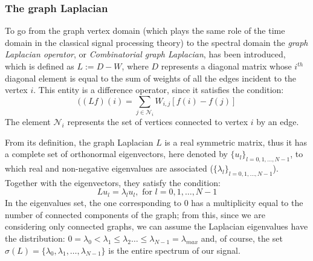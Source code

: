 \subsubsection{The graph Laplacian}
\label{sec:graph laplacian}
To go from the graph vertex domain (which plays the same role of the time domain in the classical signal processing theory) to the spectral domain the \textit{graph Laplacian operator}, or \textit{Combinatorial graph Laplacian}, has been introduced, which is defined as $L := D - W$, where $D$ represents a diagonal matrix whose  $i^{th}$ diagonal element is equal to the sum of weights of all the edges incident to the vertex $i$. This entity is a difference operator, since it satisfies the condition:
\begin{equation}
((L f)(i) = \sum_{j \in \mathcal{N}_i} W_{i,j}[f(i) - f(j)]
\end{equation}
The element $\mathcal{N}_i$ represents the set of vertices connected to vertex $i$ by an edge.

From its definition, the graph Laplacian $L$ is a real symmetric matrix, thus it has a complete set of orthonormal eigenvectors, here denoted by $\{u_l\}_{l=0,1,\dots,N-1}$, to which real and non-negative eigenvalues are associated ($\{\lambda_l\}_{l=0,1,\dots,N-1}$). Together with the eigenvectors, they satisfy the condition:
\begin{equation}
L u_l = \lambda_l u_l, \text{   for  } l = 0,1,\dots,N-1
\end{equation}
In the eigenvalues set, the one corresponding to $0$ has a multiplicity equal to the number of connected components of the graph; from this, since we are considering only connected graphs, we can assume the Laplacian eigenvalues have the distribution: $0 = \lambda_0 < \lambda_1 \leq \lambda_2 \dots \leq \lambda_{N-1} = \lambda_{max}$ and, of course, the set $\sigma(L) = \{\lambda_0, \lambda_1,\dots,\lambda_{N-1}\}$ is the entire spectrum of our signal.

